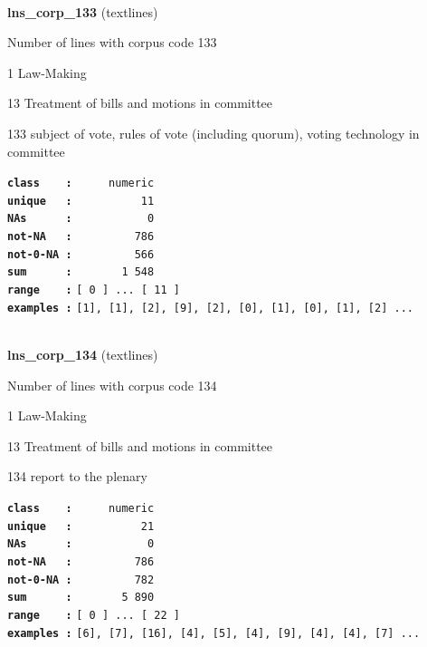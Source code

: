 \documentclass[]{article}
\begin{document}
~

\textbf{lns\_corp\_133} (textlines)

Number of lines with corpus code 133

1 Law-Making

13 Treatment of bills and motions in committee

133 subject of vote, rules of vote (including quorum), voting technology
in committee

\textbf{\texttt{class\ \ \ \ :}} \texttt{~~~~~numeric}\\
\textbf{\texttt{unique\ \ \ :}} \texttt{~~~~~~~~~~11}\\
\textbf{\texttt{NAs\ \ \ \ \ \ :}} \texttt{~~~~~~~~~~~0}\\
\textbf{\texttt{not-NA\ \ \ :}} \texttt{~~~~~~~~~786}\\
\textbf{\texttt{not-0-NA\ :}} \texttt{~~~~~~~~~566}\\
\textbf{\texttt{sum\ \ \ \ \ \ :}} \texttt{~~~~~~~1~548}\\
\textbf{\texttt{range\ \ \ \ :}}
\texttt{{[}\ 0\ {]}\ ...\ {[}\ 11\ {]}}\\
\textbf{\texttt{examples\ :}}
\texttt{{[}1{]},\ {[}1{]},\ {[}2{]},\ {[}9{]},\ {[}2{]},\ {[}0{]},\ {[}1{]},\ {[}0{]},\ {[}1{]},\ {[}2{]}\ ...}\\

~

\textbf{lns\_corp\_134} (textlines)

Number of lines with corpus code 134

1 Law-Making

13 Treatment of bills and motions in committee

134 report to the plenary

\textbf{\texttt{class\ \ \ \ :}} \texttt{~~~~~numeric}\\
\textbf{\texttt{unique\ \ \ :}} \texttt{~~~~~~~~~~21}\\
\textbf{\texttt{NAs\ \ \ \ \ \ :}} \texttt{~~~~~~~~~~~0}\\
\textbf{\texttt{not-NA\ \ \ :}} \texttt{~~~~~~~~~786}\\
\textbf{\texttt{not-0-NA\ :}} \texttt{~~~~~~~~~782}\\
\textbf{\texttt{sum\ \ \ \ \ \ :}} \texttt{~~~~~~~5~890}\\
\textbf{\texttt{range\ \ \ \ :}}
\texttt{{[}\ 0\ {]}\ ...\ {[}\ 22\ {]}}\\
\textbf{\texttt{examples\ :}}
\texttt{{[}6{]},\ {[}7{]},\ {[}16{]},\ {[}4{]},\ {[}5{]},\ {[}4{]},\ {[}9{]},\ {[}4{]},\ {[}4{]},\ {[}7{]}\ ...}\\
\end{document}
